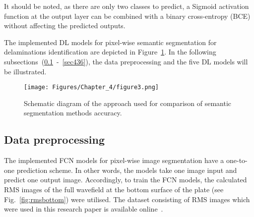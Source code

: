 It should be noted, as there are only two classes to predict, a Sigmoid activation function at the output layer can be combined with a binary cross-entropy (BCE) without affecting the predicted outputs.

The implemented DL models for pixel-wise semantic segmentation for delaminations identification are depicted in Figure~\ref{fig:flowchart}.
In the following subsections~(\ref{sec431}~-~\ref{sec436}), the data preprocessing and the five DL models will be illustrated.
\begin{figure} [h!]
	\begin{center}
		\texttt{[image: Figures/Chapter\_4/figure3.png]}
	\end{center}
	\caption{Schematic diagram of the approach used for comparison of semantic segmentation methods accuracy.} 
	\label{fig:flowchart}
\end{figure}
\subsection{Data preprocessing}
\label{sec431}
The implemented FCN models for pixel-wise image segmentation have a one-to-one prediction scheme.
In other words, the models take one image input and predict one output image.
Accordingly, to train the FCN models, the calculated RMS images of the full wavefield at the bottom surface of the plate (see Fig.~\ref{fig:rmsbottom}) were utilised.
The dataset consisting of RMS images which were used in this research paper is available online~\cite{Kudela2020d}.


